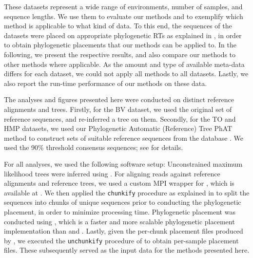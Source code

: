These datasets represent a wide range of environments, number of samples, and sequence lengths.
We use them to evaluate our methods and to exemplify which method is applicable to what kind of data.
To this end, the sequences of the datasets were placed on appropriate phylogenetic \acp{RT} as explained
in , in order to obtain phylogenetic placements that our methods can be applied to.
In the following, we present the respective results, and also compare our methods to other methods
where applicable.
As the amount and type of available meta-data differs for each dataset,
we could not apply all methods to all datasets.
Lastly, we also report the run-time performance of our methods on these data.

The analyses and figures presented here were conducted on distinct reference alignments and trees.
Firstly, for the \ac{BV} dataset, we used the original set of reference sequences, and re-inferred a tree on them.
Secondly, for the \ac{TO} and \ac{HMP} datasets, we used our Phylogenetic Automatic (Reference) Tree \ac{PhAT} method \cite{Czech2018}
to construct sets of suitable reference sequences from the  database \cite{Quast2013,Yilmaz2014}.
We used the 90\% threshold consensus sequences;
see \cite{Czech2018} for details.

For all analyses, we used the following software setup:
Unconstrained maximum likelihood trees were inferred using  \cite{Stamatakis2014}.
For aligning reads against reference alignments and reference trees,
we used a custom MPI wrapper for  \cite{Berger2011a,Berger2012},
which is available at \cite{PaPaRaMPI}.
We then applied the \texttt{chunkify} procedure as explained in \cite{Czech2018}
to split the sequences into chunks of unique sequences prior to conducting the phylogenetic placement,
in order to minimize processing time.
Phylogenetic placement was conducted using  \cite{Barbera2018},
which is a faster and more scalable phylogenetic placement implementation
than  \cite{Berger2011} and  \cite{Matsen2010}.
Lastly, given the per-chunk placement files produced by , we executed the \texttt{unchunkify} procedure of \cite{Czech2018}
to obtain per-sample placement files. These subsequently served as the input data for the methods presented here.

